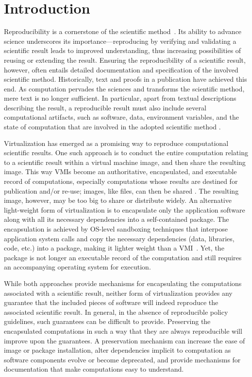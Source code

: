 \section{Introduction}

Reproducibility is a cornerstone of the scientific method~\cite{borgman2012data}. 
Its ability to advance science underscores its importance---reproducing by verifying and validating a scientific result leads to improved understanding, thus increasing possibilities of reusing or extending the result. 
Ensuring the reproducibility of a scientific result, however, often entails detailed documentation and specification of the involved scientific method. Historically, text and proofs in a publication have achieved this end. 
As computation pervades the sciences and transforms the scientific method, mere text is no longer sufficient. 
In particular, apart from textual descriptions describing the result, a reproducible result must also include several computational artifacts, such as software, data,  environment variables, and the state of computation that are involved in the adopted scientific method \cite{Sole}.  

Virtualization has emerged as a promising way to reproduce computational scientific results. One such approach is to conduct the entire computation relating to a scientific result within a virtual machine image, and then share the resulting image. This way VMIs become an authoritative, encapsulated, and executable record of computations, especially computations whose results are destined for publication and/or re-use; images, like files, can then be shared \cite{Lampoudi}. 
The resulting image, however, may be too big to share or distribute widely. An alternative light-weight form of virtualization is to encapsulate only the application software along with all its necessary dependencies into a self-contained package. The encapsulation is achieved by OS-level sandboxing techniques that interpose application system calls and copy the necessary dependencies (data, libraries, code, etc.) into a package, making it lighter weight than a VMI~\cite{guo2011cde}. Yet, the package is not longer an executable record of the computation and still requires an accompanying operating system for execution. 

While both approaches provide mechanisms for encapsulating the computations associated with a scientific result, neither form of virtualization provides any guarantee that the included pieces of software will indeed reproduce the associated scientific result. In general, in the absence of reproducible policy guidelines, such guarantees can be difficult to provide. Preserving the encapsulated computations in such a way that they are always reproducible will improve upon the guarantees. A preservation mechanism can increase the ease of image or package installation, alter dependencies implicit to computation as software components evolve or become deprecated, and provide mechanisms for documentation that make computations easy to understand.

